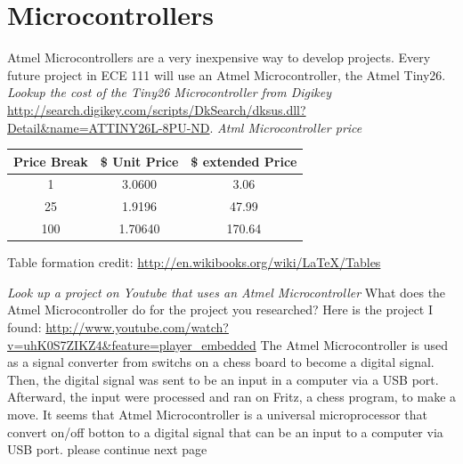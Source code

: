 \documentclass{article}
\begin{document}
\section{Microcontrollers}
Atmel Microcontrollers are a very inexpensive way to develop projects.  Every future project in ECE 111 will use an Atmel Microcontroller, the Atmel Tiny26.\newline
\emph{Lookup the cost of the Tiny26 Microcontroller from Digikey}\newline
\url{http://search.digikey.com/scripts/DkSearch/dksus.dll?Detail&name=ATTINY26L-8PU-ND}.
\newline \newline
\emph{Atml Microcontroller price}\newline
\begin {center}

\begin{tabular}{|c| c| c|}
\hline
Price Break & \$ Unit Price & \$ extended Price\\
\hline
1 & 3.0600 &3.06 \\
25&1.9196&47.99\\
100&1.70640&170.64\\
\hline
\end{tabular}
\end{center}

Table formation credit: \url{http://en.wikibooks.org/wiki/LaTeX/Tables}\newline



\emph{Look up a project on Youtube that uses an Atmel Microcontroller}\newline
What does the Atmel Microcontroller do for the project you researched?\newline\newline
Here is the project I found: \url{http://www.youtube.com/watch?v=uhK0S7ZIKZ4&feature=player_embedded}\newline\newline
The Atmel Microcontroller is used as a signal converter from switchs on a chess board to become a digital signal.  Then, the digital signal was sent to be an input in a computer via a USB port. Afterward, the input were processed and ran on Fritz, a chess program, to make a move. It seems that Atmel Microcontroller is a universal microprocessor that convert on/off botton to a digital signal that can be an input to a computer via USB port. \newline
\newline
please continue next page 
\end{document}
